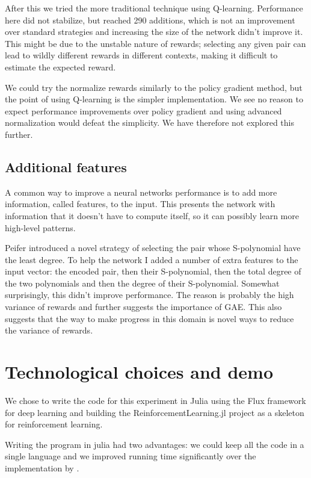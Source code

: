 \documentclass{article}
\theoremstyle{changedot}
\theoremstyle{changedotbreak}
\theoremstyle{nonumberplain}
\begin{document}
After this we tried the more traditional technique using Q-learning. Performance here did not stabilize, but reached 290 additions, which is not an improvement over standard strategies and increasing the size of the network didn't improve it. This might be due to the unstable nature of rewards; selecting any given pair can lead to wildly different rewards in different contexts, making it difficult to estimate the expected reward.

We could try the normalize rewards similarly to the policy gradient method, but the point of using Q-learning is the simpler implementation. We see no reason to expect performance improvements over policy gradient and using advanced normalization would defeat the simplicity. We have therefore not explored this further.

\subsection{Additional features}
A common way to improve a neural networks performance is to add more information, called features, to the input. This presents the network with information that it doesn't have to compute itself, so it can possibly learn more high-level patterns.

Peifer introduced a novel strategy of selecting the pair whose S-polynomial have the least degree. To help the network I added a number of extra features to the input vector: the encoded pair, then their S-polynomial, then the total degree of the two polynomials and then the degree of their S-polynomial. Somewhat surprisingly, this didn't improve performance. The reason is probably the high variance of rewards and further suggests the importance of GAE. This also suggests that the way to make progress in this domain is novel ways to reduce the variance of rewards.

\section{Technological choices and demo}
We chose to write the code for this experiment in Julia \cite{julia} using the Flux \cite{Flux.jl} framework for deep learning and building the ReinforcementLearning.jl \cite{ReinforcementLearning.jl} project as a skeleton for reinforcement learning.

Writing the program in julia had two advantages: we could keep all the code in a single language and we improved running time significantly over the implementation by \cite{peifer}.
\end{document}
